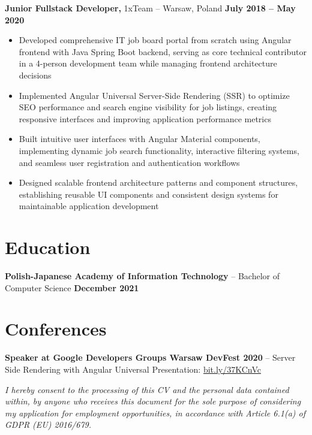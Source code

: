 \documentclass[10pt]{article}       %
\begin{document}
\textbf{Junior Fullstack Developer,} 1xTeam -- Warsaw, Poland \hfill \textbf{July 2018 -- May 2020} \\
\vspace{-5pt}
\begin{itemize}
  \item Developed comprehensive IT job board portal from scratch using Angular frontend with Java Spring Boot backend, serving as core technical contributor in a 4-person development team while managing frontend architecture decisions
  \item Implemented Angular Universal Server-Side Rendering (SSR) to optimize SEO performance and search engine visibility for job listings, creating responsive interfaces and improving application performance metrics
  \item  Built intuitive user interfaces with Angular Material components, implementing dynamic job search functionality, interactive filtering systems, and seamless user registration and authentication workflows
  \item Designed scalable frontend architecture patterns and component structures, establishing reusable UI components and consistent design systems for maintainable application development
\end{itemize}

\vspace{-10pt}
\section*{Education}
\textbf{Polish-Japanese Academy of Information Technology} -- Bachelor of Computer Science \hfill \textbf{December 2021}
\vspace{-10pt}
\section*{Conferences}
\textbf{Speaker at Google Developers Groups Warsaw DevFest 2020}  – Server Side Rendering with Angular Universal
Presentation: \href{https://bit.ly/37KCnVc}{bit.ly/37KCnVc}

\vspace{15pt}
\footnotesize
\textit{I hereby consent to the processing of this CV and the personal data contained within, by anyone who receives this document for the sole purpose of considering my application for employment opportunities, in accordance with Article 6.1(a) of GDPR (EU) 2016/679.}
\end{document}
